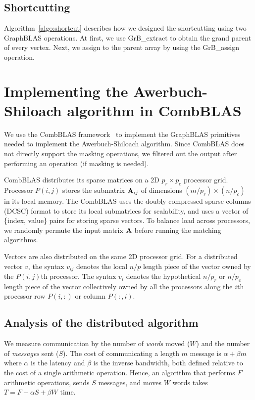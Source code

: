 \subsection{Shortcutting}
Algorithm~\ref{algo:shortcut} describes how we designed the shortcutting using two GraphBLAS operations.
At first, we use  GrB\_extract to obtain the grand parent  of every vertex. Next, we assign  to the parent array by using the GrB\_assign operation.


\section{Implementing the Awerbuch-Shiloach algorithm in CombBLAS}
We use the CombBLAS framework~\cite{bulucc2011combinatorial} to implement the GraphBLAS primitives needed to implement the Awerbuch-Shiloach algorithm.
Since CombBLAS does not directly support the masking operations, we filtered out the output after performing an operation (if masking is needed). 

CombBLAS distributes its sparse matrices on a 2D $p_r \times p_c$ processor grid.
Processor $P(i,j)$ stores the submatrix $\mathbf{A}_{ij}$ of dimensions $(m/p_r)\times (n/p_c)$ in its local memory. 
The CombBLAS uses the doubly compressed sparse columns (DCSC) format to store its local submatrices for scalability, 
and uses a vector of \{index, value\} pairs for storing sparse vectors. 
To balance load across processors, we randomly permute the input matrix $\mathbf{A}$ before running the matching algorithms.

Vectors are also distributed on the same 2D processor grid. 
For a distributed vector $v$, the syntax $v_{ij}$ denotes the local $n/p$ length piece of the vector owned by the $P(i, j)$th processor. 
The syntax $v_i$ denotes the hypothetical $n/p_r$ or $n/p_c$ length piece of the vector collectively owned by all the processors along the $i$th processor row $P(i, :)$ or column $P(:, i)$.


\subsection{Analysis of the distributed algorithm}
We measure communication by the number of {\em words} moved ($W$) and
the number of {\em messages} sent ($S$). The cost of communicating a length $m$ message is $\alpha + \beta m$ where $\alpha$ is the
latency and $\beta$ is the inverse bandwidth, both defined relative to the cost of a single arithmetic operation. Hence, an algorithm that
performs $F$ arithmetic operations, sends $S$ messages, and moves $W$ words takes $T= F + \alpha S + \beta W$ time. 

